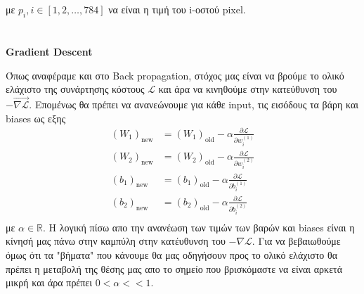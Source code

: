 \documentclass[a4paper,12pt]{article}
\begin{document}
με $p_i, i\in [1,2,\dots, 784]$ να είναι η τιμή του i-οστού pixel.



\newpage
\section*{}
\begin{center}
    \Large \textbf{Gradient Descent}
\end{center}

Όπως αναφέραμε και στο Back propagation, στόχος μας είναι να βρούμε το ολικό ελάχιστο της συνάρτησης κόστους  $\mathcal{L}$ και άρα να κινηθούμε στην κατεύθυνση του $-\overrightarrow{\nabla \mathcal{L}}$.
Επομένως θα πρέπει να ανανεώνουμε για κάθε input, τις εισόδους τα βάρη και biases ως εξης
\begin{align*}
    \left( W_1\right)_{\text{new}} &= \left( W_1\right)_{\text{old}} - \alpha \frac{\partial \mathcal{L}}{\partial w_{i}^{(1)}} \\
    \left( W_2\right)_{\text{new}} &= \left( W_2\right)_{\text{old}} - \alpha \frac{\partial \mathcal{L}}{\partial w_{i}^{(2)}} \\
    \left( b_1\right)_{\text{new}} &= \left( b_1\right)_{\text{old}} - \alpha \frac{\partial \mathcal{L}}{\partial b_{i}^{(1)}} \\
    \left( b_2\right)_{\text{new}} &= \left( b_2\right)_{\text{old}} - \alpha \frac{\partial \mathcal{L}}{\partial b_{i}^{(2)}} \\
\end{align*}
με $\alpha \in \mathbb{R}$. Η λογική πίσω απο την ανανέωση των τιμών των βαρών και biases είναι η κίνησή μας πάνω στην καμπύλη
στην κατέυθυνση του $-\nabla \mathcal{L}$. Για να βεβαιωθούμε όμως ότι τα "βήματα" που κάνουμε θα μας οδηγήσουν προς το ολικό ελάχιστο
θα πρέπει η μεταβολή της θέσης μας απο το σημείο που βρισκόμαστε να είναι αρκετά μικρή και άρα πρέπει $0<\alpha <<1$.
\end{document}
